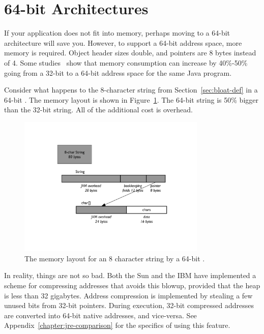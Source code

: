 \section{64-bit Architectures}

If your application does not fit into memory, perhaps moving to a 64-bit architecture will save you. 
However, to support a 64-bit address space, more memory is required. Object header sizes double, and pointers are
8 bytes instead of 4. Some studies~\cite{compressedAddress} show that memory consumption can increase by 40\%-50\%
going from a 32-bit to a 64-bit address space for the same Java program.

Consider what happens to the 8-character string from
Section~\ref{sec:bloat-def} in a 64-bit \jre. The memory layout is shown in
Figure~\ref{fig:8-char-string-64-bit}. The 64-bit string is 50\% bigger than the 32-bit string. All of the
additional cost is overhead.
 
 \begin{figure}
  \centering

 \includegraphics[width=0.8\textwidth]{part1/Figures/modelingdatatypes/8-char-string-64-bit.pdf}
  \caption{The memory layout for an 8 character string by a 64-bit \jre.}
  \label{fig:8-char-string-64-bit}
\end{figure}

In reality, things are not so bad. Both the Sun and the IBM \jres have
implemented a scheme for compressing addresses that avoids this blowup, provided that the heap is
less than 32 gigabytes. Address compression is implemented by stealing a few unused bits from 32-bit pointers.
During execution, 32-bit compressed addresses are converted into 64-bit native addresses, and vice-versa.
See Appendix~\ref{chapter:jre-comparison} for the specifics of using this
feature.


